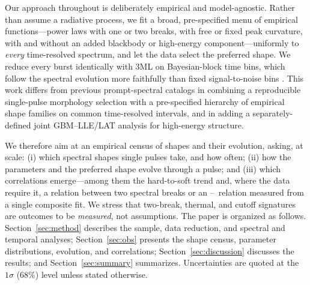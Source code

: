 Our approach throughout is deliberately empirical and model-agnostic. Rather than
assume a radiative process, we fit a broad, pre-specified menu of empirical
functions---power laws with one or two breaks, with free or fixed peak curvature,
with and without an added blackbody or high-energy component---uniformly to
\emph{every} time-resolved spectrum, and let the data select the preferred shape. We
reduce every burst identically with \textsc{3ML} \citep{Vianello2015} on
Bayesian-block time bins, which follow the spectral evolution more faithfully than
fixed signal-to-noise bins \citep{Scargle2013}. This work differs from previous
prompt-spectral catalogs in combining a reproducible single-pulse morphology
selection \citep{Busby2024} with a pre-specified hierarchy of empirical shape
families on common time-resolved intervals, and in adding a separately-defined joint
GBM--LLE/LAT analysis for high-energy structure.

We therefore aim at an empirical census of shapes and their evolution, asking, at
scale: (i) which spectral shapes single pulses take, and how often; (ii) how the
parameters and the preferred shape evolve through a pulse; and (iii) which
correlations emerge---among them the hard-to-soft trend \citep{Lu2012,Busby2024}
and, where the data require it, a relation between two spectral breaks or an
\Ep--\kT\ relation measured from a single composite fit. We stress that two-break,
thermal, and cutoff signatures are outcomes to be \emph{measured}, not assumptions.
The paper is organized as follows. Section~\ref{sec:method} describes the sample,
data reduction, and spectral and temporal analyses; Section~\ref{sec:obs} presents
the shape census, parameter distributions, evolution, and correlations;
Section~\ref{sec:discussion} discusses the results; and Section~\ref{sec:summary}
summarizes. Uncertainties are quoted at the $1\sigma$ (68\%) level unless stated
otherwise.

